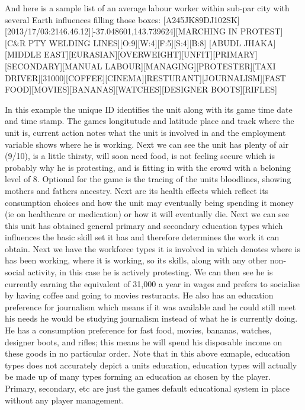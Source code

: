 And here is a sample list of an average labour worker within sub-par city with several Earth influences filling those boxes:
[A245JK89DJ102SK][2013/17/03:2146.46.12][-37.048601,143.739624][MARCHING IN PROTEST][C&R PTY WELDING LINES][O:9][W:4][F:5][S:4][B:8]
[ABUDL JHAKA][MIDDLE EAST][EURASIAN][OVERWEIGHT][UNFIT][PRIMARY][SECONDARY][MANUAL LABOUR][MANAGING][PROTESTER][TAXI DRIVER][31000][COFFEE][CINEMA][RESTURANT][JOURNALISM][FAST FOOD][MOVIES][BANANAS][WATCHES][DESIGNER BOOTS][RIFLES]



In this example the unique ID identifies the unit along with its game time date and time stamp. The games longitutude and latitude place and track where the unit is, current action notes what the unit is involved in and the employment variable shows where he is working.
Next we can see the unit has plenty of air (9/10), is a little thirsty, will soon need food, is not feeling secure which is probably why he is protesting, and is fitting in with the crowd with a beloning level of 8. Optional for the game is the tracing of the units bloodlines, showing mothers and fathers ancestry. Next are its health effects which reflect its consumption choices and how the unit may eventually being spending it money (ie on healthcare or medication) or how it will eventually die. Next we can see this unit has obtained general primary and secondary education types which influences the basic skill set it has and therefore determines the work it can obtain. Next we have the workforce types it is involved in which denotes where is has been working, where it is working, so its skills, along with any other non-social activity, in this case he is actively protesting. We can then see he is currently earning the equivalent of 31,000 a year in wages and prefers to socialise by having coffee and going to movies resturants. He also has an education preference for journalism which means if it was available and he could still meet his needs he would be studying journalism instead of what he is currently doing. He has 
a consumption preference for fast food, movies, bananas, watches, designer boots, and rifles; this means he will spend his disposable income on these goods in no particular order. Note that in this above exmaple, education types does not accurately depict a units education, education types will actually be made up of many types forming an education as chosen by the player. Primary, secondary, etc are just the games default educational system in place without any player management.


